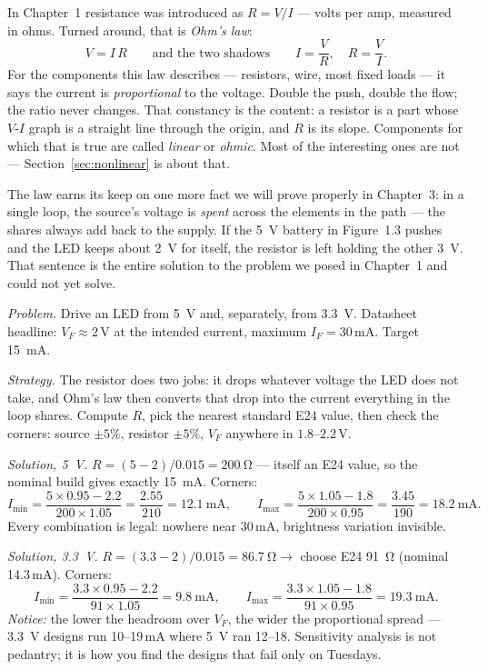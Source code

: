 In Chapter~1 resistance was introduced as $R=V/I$ — volts per amp, measured in
ohms. Turned around, that is \emph{Ohm's law}:
\[
  V = I\,R \qquad\text{and the two shadows}\qquad I = \frac{V}{R},
  \quad R = \frac{V}{I}.
\]
For the components this law describes — resistors, wire, most fixed loads —
it says the current is \emph{proportional} to the voltage. Double the push,
double the flow; the ratio never changes. That constancy is the content: a
resistor is a part whose $V$-$I$ graph is a straight line through the origin,
and $R$ is its slope. Components for which that is
true are called \emph{linear} or \emph{ohmic}. Most of
the interesting ones are not — Section~\ref{sec:nonlinear} is about that.

The law earns its keep on one more fact we will prove properly in
Chapter~3: in a single loop, the source's voltage is \emph{spent} across the
elements in the path — the shares always add back to the supply. If the
\qty{5}{\volt} battery in Figure~1.3 pushes and the LED keeps about
\qty{2}{\volt} for itself, the resistor is left holding the other
\qty{3}{\volt}. That sentence is the entire solution to the problem we posed
in Chapter~1 and could not yet solve.

\begin{example}
\label{ex:ledsizing}
\emph{Problem.} Drive an LED from \qty{5}{\volt} and, separately, from
\qty{3.3}{\volt}. Datasheet headline: $V_F \approx 2$\,V at the intended
current, maximum $I_F = 30$\,mA. Target \qty{15}{\milli\ampere}.\par
\emph{Strategy.} The resistor does two jobs: it drops whatever voltage the
LED does not take, and Ohm's law then converts that drop into the current
everything in the loop shares. Compute $R$, pick the nearest standard E24
value, then check the corners: source $\pm 5\%$, resistor $\pm 5\%$,
$V_F$ anywhere in $1.8$--$2.2$\,V.\par
\emph{Solution, \qty{5}{\volt}.} $R = (5-2)/0.015 = \qty{200}{\ohm}$ — itself
an E24 value, so the nominal build gives exactly \qty{15}{\milli\ampere}.
Corners:
\[
  I_{\min} = \frac{5\times0.95 - 2.2}{200\times1.05}
           = \frac{2.55}{210} = 12.1\ \mathrm{mA},
  \qquad
  I_{\max} = \frac{5\times1.05 - 1.8}{200\times0.95}
           = \frac{3.45}{190} = 18.2\ \mathrm{mA}.
\]
Every combination is legal: nowhere near 30\,mA, brightness variation
invisible.\par
\emph{Solution, \qty{3.3}{\volt}.} $R = (3.3-2)/0.015 = \qty{86.7}{\ohm}
\rightarrow$ choose E24 \qty{91}{\ohm} (nominal 14.3\,mA). Corners:
\[
  I_{\min} = \frac{3.3\times0.95-2.2}{91\times1.05} = 9.8\ \mathrm{mA},
  \qquad
  I_{\max} = \frac{3.3\times1.05-1.8}{91\times0.95} = 19.3\ \mathrm{mA}.
\]
\emph{Notice:} the lower the headroom over $V_F$, the wider the proportional
spread — \qty{3.3}{\volt} designs run 10--19\,mA where \qty{5}{\volt} ran
12--18. Sensitivity analysis is not pedantry; it is how you find the
designs that fail only on Tuesdays.
\end{example}

